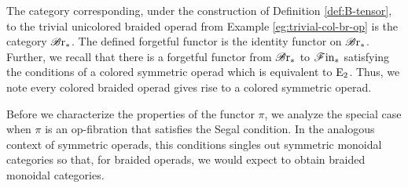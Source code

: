 \begin{eg}\label{eg:br-fib-trivial}
    The category corresponding, under the construction of Definition \ref{def:B-tensor}, 
    to the trivial unicolored braided
    operad from Example \ref{eg:trivial-col-br-op} is the category $\mathscr{B} \text{r}_{\ast}$.
    The defined forgetful functor is the identity functor on $\mathscr{B} \text{r}_{\ast}$.
    Further, we recall that there is a forgetful functor from $\mathscr{B} \text{r}_{\ast}$ to $\mathscr{F} \text{in}_{\ast}$
    satisfying the conditions of a colored symmetric operad which is equivalent to $\operatorname{E}_2$.
    Thus, we note every colored braided operad gives rise to a colored
    symmetric operad.
\end{eg}

Before we characterize the properties of the functor $\pi$, we analyze the
special case when $\pi$ is an op-fibration that satisfies the Segal condition.
In the analogous context of symmetric operads, this conditions singles out
symmetric monoidal categories so that, for braided operads, we would expect to
obtain braided monoidal categories.






